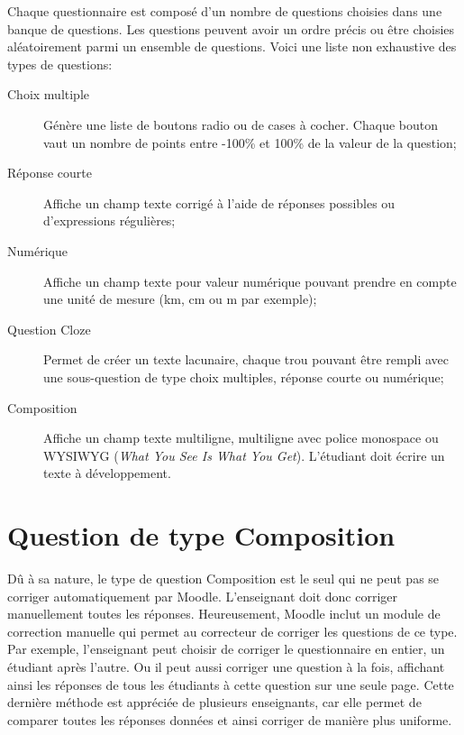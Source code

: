 Chaque questionnaire est composé d'un nombre de questions choisies dans une banque de questions.
Les questions peuvent avoir un ordre précis ou être choisies aléatoirement parmi un ensemble de questions.
Voici une liste non exhaustive des types de questions:

\begin{description}
  \item[Choix multiple]
  
  Génère une liste de boutons radio ou de cases à cocher.
  Chaque bouton vaut un nombre de points entre -100\% et 100\% de la valeur de la question;
  
  \item[Réponse courte]
  
  Affiche un champ texte corrigé à l'aide de réponses possibles ou d'expressions régulières;
  
  \item[Numérique]
  
  Affiche un champ texte pour valeur numérique pouvant prendre en compte une unité de mesure (km, cm ou m par exemple);
  
  \item[Question Cloze]
  
  Permet de créer un texte lacunaire, chaque \og trou \fg{} pouvant être rempli avec une sous-question de type choix multiples, réponse courte ou numérique;
  
  \item[Composition]
  
  Affiche un champ texte multiligne, multiligne avec police monospace ou WYSIWYG (\textit{What You See Is What You Get}).
  L'étudiant doit écrire un texte à développement.
\end{description}

\section{Question de type Composition}



Dû à sa nature, le type de question Composition est le seul qui ne peut pas se corriger automatiquement par Moodle.
L'enseignant doit donc corriger manuellement toutes les réponses.
Heureusement, Moodle inclut un module de correction manuelle qui permet au correcteur de corriger les questions de ce type.
Par exemple, l'enseignant peut choisir de corriger le questionnaire en entier, un étudiant après l'autre.
Ou il peut aussi corriger une question à la fois, affichant ainsi les réponses de tous les étudiants à cette question sur une seule page.
Cette dernière méthode est appréciée de plusieurs enseignants, car elle permet de comparer toutes les réponses données et ainsi corriger de manière plus uniforme.

